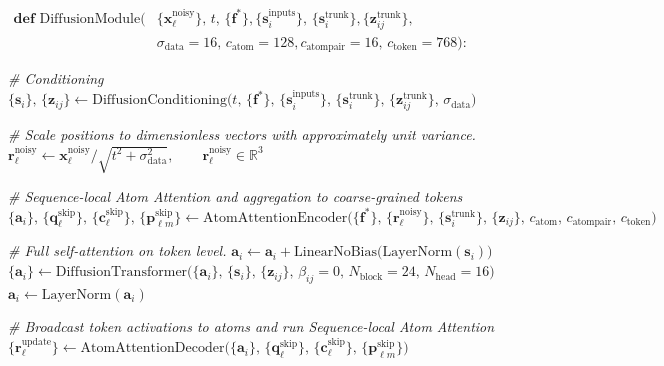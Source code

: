 \newcommand{\AlgHeader}[1]{\Statex \textit{\# #1}}

\begin{algorithm}
\caption{Diffusion Module}
\label{alg:diffusion_module}
\begin{algorithmic}[1]

\Statex $ \begin{aligned} \textbf{def} \,\,  \text{DiffusionModule}(
&\{\mathbf{x}^{\text{noisy}}_{\ell}\},\, t,\, \{\mathbf{f}^*\},
\{\mathbf{s}^{\text{inputs}}_i\},\, \{\mathbf{s}^{\text{trunk}}_i\},
\{\mathbf{z}^{\text{trunk}}_{ij}\},\\
&\sigma_{\text{data}}=16,\,
c_{\text{atom}}=128,
c_{\text{atompair}}=16,\,
c_{\text{token}}=768):
\end{aligned}$


\Statex

\AlgHeader{Conditioning}
\State
$\{\mathbf{s}_i\},\, \{\mathbf{z}_{ij}\}
\gets
\mathrm{DiffusionConditioning}
\bigl(
t,\, \{\mathbf{f}^*\},\, \{\mathbf{s}^{\text{inputs}}_i\},\,
\{\mathbf{s}^{\text{trunk}}_i\},\, \{\mathbf{z}^{\text{trunk}}_{ij}\},\,
\sigma_{\text{data}}
\bigr)$

\AlgHeader{Scale positions to dimensionless vectors with approximately unit variance.}
\State
$\mathbf{r}^{\text{noisy}}_{\ell}
\gets
\mathbf{x}^{\text{noisy}}_{\ell} \big/ \sqrt{t^2 + \sigma_{\text{data}}^2},
\qquad
\mathbf{r}^{\text{noisy}}_{\ell}\in\mathbb{R}^3$
\Statex

\AlgHeader{Sequence-local Atom Attention and aggregation to coarse-grained tokens}
\State
$\{\mathbf{a}_i\},\,
\{\mathbf{q}^{\text{skip}}_{\ell}\},\,
\{\mathbf{c}^{\text{skip}}_{\ell}\},\,
\{\mathbf{p}^{\text{skip}}_{\ell m}\}
\gets
\mathrm{AtomAttentionEncoder}
\bigl(
\{\mathbf{f}^*\},\,
\{\mathbf{r}^{\text{noisy}}_{\ell}\},\,
\{\mathbf{s}^{\text{trunk}}_i\},\,
\{\mathbf{z}_{ij}\},\,
c_{\text{atom}},\, c_{\text{atompair}},\, c_{\text{token}}
\bigr)$

\Statex

\AlgHeader{Full self-attention on token level.}
\State
$\mathbf{a}_i \gets \mathbf{a}_i + \mathrm{LinearNoBias}\bigl(\mathrm{LayerNorm}(\mathbf{s}_i)\bigr)$
\State
$\{\mathbf{a}_i\}
\gets
\mathrm{DiffusionTransformer}
\bigl(
\{\mathbf{a}_i\},\, \{\mathbf{s}_i\},\, \{\mathbf{z}_{ij}\},\,
\beta_{ij}=0,\,
N_{\text{block}}=24,\,
N_{\text{head}}=16
\bigr)$
\State
$\mathbf{a}_i \gets \mathrm{LayerNorm}(\mathbf{a}_i)$

\AlgHeader{Broadcast token activations to atoms and run Sequence-local Atom Attention}
\State
$\{\mathbf{r}^{\text{update}}_{\ell}\}
\gets
\mathrm{AtomAttentionDecoder}
\bigl(
\{\mathbf{a}_i\},\,
\{\mathbf{q}^{\text{skip}}_{\ell}\},\,
\{\mathbf{c}^{\text{skip}}_{\ell}\},\,
\{\mathbf{p}^{\text{skip}}_{\ell m}\}
\bigr)$


\end{algorithmic}
\end{algorithm}
